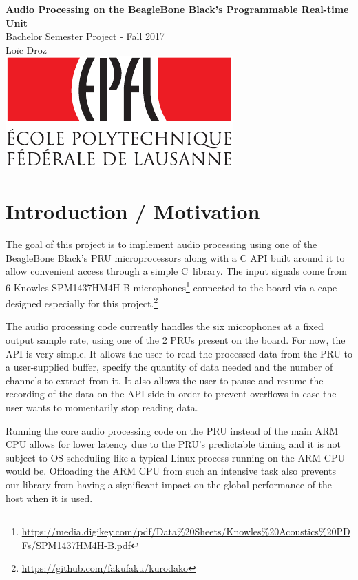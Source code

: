 \documentclass[]{report}
\begin{document}
\begin{titlepage}
	\centering
	\vspace*{50px}
	\vfill
	{
		\textbf{\LARGE Audio Processing on the BeagleBone Black's Programmable Real-time Unit}\\
		\vskip0.5cm
		{\LARGE Bachelor Semester Project - Fall 2017} \\
		\vskip2cm
		{\Large Loïc Droz}\\
	}    
	\vfill
	\vskip5cm
	\includegraphics[width=0.5\linewidth]{Pictures/epfl}
\end{titlepage}


\tableofcontents


\hypertarget{introduction-motivation}{%
\chapter{Introduction / Motivation}\label{introduction-motivation}}

The goal of this project is to implement audio processing using one of the BeagleBone Black's PRU microprocessors along with a C API built around it to allow convenient access through a simple C~library. The input signals come from 6 Knowles SPM1437HM4H-B microphones\footnote{\url{https://media.digikey.com/pdf/Data\%20Sheets/Knowles\%20Acoustics\%20PDFs/SPM1437HM4H-B.pdf}} connected to the board via a cape designed especially for this project.\footnote{\url{https://github.com/fakufaku/kurodako}}

The audio processing code currently handles the six microphones at a fixed output sample rate, using one of the 2 PRUs present on the board. For now, the API is very simple. It allows the user to read the processed data from the PRU to a user-supplied buffer, specify the quantity of data needed and the number of channels to extract from it. It also allows the user to pause and resume the recording of the data on the API side in order to prevent overflows in case the user wants to momentarily stop reading data.

Running the core audio processing code on the PRU instead of the main ARM CPU allows for lower latency due to the PRU's predictable timing and it is not subject to OS-scheduling like a typical Linux process running on the ARM CPU would be. Offloading the ARM CPU from such an intensive task also prevents our library from having a significant impact on the global performance of the host when it is used.
\end{document}

